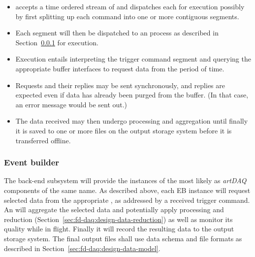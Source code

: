 \begin{itemize}
\item {} accepts a time ordered stream of  and dispatches each for execution possibly by first splitting up each command into one or more contiguous segments.
\item Each segment will then be dispatched to an  process as described in Section~\ref{sec:fd-daq:design-event-builder} for execution.
\item Execution entails interpreting the trigger command segment and querying the appropriate  buffer interfaces to request data from the period of time. 
\item Requests and their replies may be sent synchronously, and
  replies are expected even if data has already been purged from the
   buffer. (In that case, an error message would be sent out.)
\item The data received may then undergo processing and aggregation
  until finally it is saved to one or more files on the output storage
  system before it is transferred offline.
\end{itemize}



\subsubsection{Event builder}
\label{sec:fd-daq:design-event-builder}

The  back-end subsystem will provide the instances of the  most likely as \textit{artDAQ}~\cite{artdaq} components of the same name.
As described above, each EB instance will request selected data from
the appropriate , as addressed by a received trigger command. 
An  will aggregate the selected data and potentially apply processing and reduction (Section~\ref{sec:fd-daq:design-data-reduction}) as well as monitor its quality while in flight.
Finally it will record the resulting data to the output storage system.
The final output files shall use data schema and file formats as described in Section~\ref{sec:fd-daq:design-data-model}.



